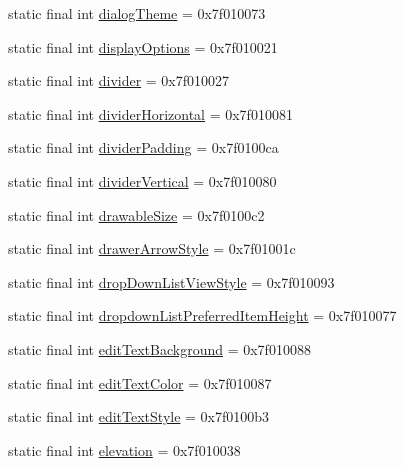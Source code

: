 \begin{CompactItemize}
static final int \hyperlink{classandroid_1_1support_1_1v7_1_1mediarouter_1_1_r_1_1attr_1a18fc08bf8e638fb45289188dfec320}{dialogTheme} = 0x7f010073
\item 
static final int \hyperlink{classandroid_1_1support_1_1v7_1_1mediarouter_1_1_r_1_1attr_8821de0497518dd88060a87db8ebb64b}{displayOptions} = 0x7f010021
\item 
static final int \hyperlink{classandroid_1_1support_1_1v7_1_1mediarouter_1_1_r_1_1attr_faa7848c972f3dde311332b99f1236e5}{divider} = 0x7f010027
\item 
static final int \hyperlink{classandroid_1_1support_1_1v7_1_1mediarouter_1_1_r_1_1attr_c13d9767dcc89e35dceaa68100bf562d}{dividerHorizontal} = 0x7f010081
\item 
static final int \hyperlink{classandroid_1_1support_1_1v7_1_1mediarouter_1_1_r_1_1attr_79106137db9b26f5db9721641a902842}{dividerPadding} = 0x7f0100ca
\item 
static final int \hyperlink{classandroid_1_1support_1_1v7_1_1mediarouter_1_1_r_1_1attr_93b59e7b59829bcdb2ba72033bb43f9e}{dividerVertical} = 0x7f010080
\item 
static final int \hyperlink{classandroid_1_1support_1_1v7_1_1mediarouter_1_1_r_1_1attr_e067b113af911e193284ccdde846ca78}{drawableSize} = 0x7f0100c2
\item 
static final int \hyperlink{classandroid_1_1support_1_1v7_1_1mediarouter_1_1_r_1_1attr_06be1d348aba0409f1f983ec164e2010}{drawerArrowStyle} = 0x7f01001c
\item 
static final int \hyperlink{classandroid_1_1support_1_1v7_1_1mediarouter_1_1_r_1_1attr_950e110dac9ced7d7d708303e7dcd03c}{dropDownListViewStyle} = 0x7f010093
\item 
static final int \hyperlink{classandroid_1_1support_1_1v7_1_1mediarouter_1_1_r_1_1attr_f13fcea26bc28006411d4d1a2d253b01}{dropdownListPreferredItemHeight} = 0x7f010077
\item 
static final int \hyperlink{classandroid_1_1support_1_1v7_1_1mediarouter_1_1_r_1_1attr_6434b58c30000b550abc678372c4f8b3}{editTextBackground} = 0x7f010088
\item 
static final int \hyperlink{classandroid_1_1support_1_1v7_1_1mediarouter_1_1_r_1_1attr_9c8570b9464b710a1635f919b1e2b7de}{editTextColor} = 0x7f010087
\item 
static final int \hyperlink{classandroid_1_1support_1_1v7_1_1mediarouter_1_1_r_1_1attr_0f02391cca5cb13cdb06a1f40ac71a37}{editTextStyle} = 0x7f0100b3
\item 
static final int \hyperlink{classandroid_1_1support_1_1v7_1_1mediarouter_1_1_r_1_1attr_c3827623f55901e9b6d0345ae1a000a2}{elevation} = 0x7f010038

\end{CompactItemize}
